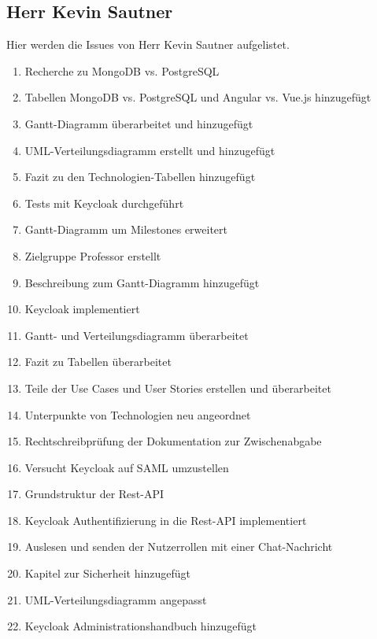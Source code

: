 \subsection{Herr Kevin Sautner}
Hier werden die Issues von Herr Kevin Sautner aufgelistet.
\begin{enumerate}
    \item Recherche zu MongoDB vs. PostgreSQL
    \item Tabellen MongoDB vs. PostgreSQL und Angular vs. Vue.js hinzugefügt
    \item Gantt-Diagramm überarbeitet und hinzugefügt
    \item UML-Verteilungsdiagramm erstellt und hinzugefügt
    \item Fazit zu den Technologien-Tabellen hinzugefügt
    \item Tests mit Keycloak durchgeführt
    \item Gantt-Diagramm um Milestones erweitert
    \item Zielgruppe Professor erstellt
    \item Beschreibung zum Gantt-Diagramm hinzugefügt
    \item Keycloak implementiert
    \item Gantt- und Verteilungsdiagramm überarbeitet
    \item Fazit zu Tabellen überarbeitet
    \item Teile der Use Cases und User Stories erstellen und überarbeitet
    \item Unterpunkte von Technologien neu angeordnet
    \item Rechtschreibprüfung der Dokumentation zur Zwischenabgabe
    \item Versucht Keycloak auf SAML umzustellen
    \item Grundstruktur der Rest-API
    \item Keycloak Authentifizierung in die Rest-API implementiert
    \item Auslesen und senden der Nutzerrollen mit einer Chat-Nachricht
    \item Kapitel zur Sicherheit hinzugefügt
    \item UML-Verteilungsdiagramm angepasst
    \item Keycloak Administrationshandbuch hinzugefügt
\end{enumerate}